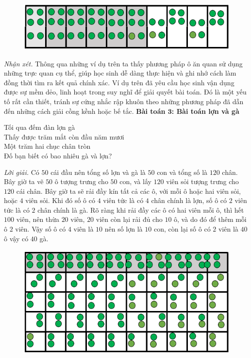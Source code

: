 \begin{multicols}{2}
	\begin{figure}[H]
		\vspace*{5pt}
		\centering
		\captionsetup{labelformat= empty, justification=centering}
		\includegraphics[width= 1\linewidth]{2}
		\vspace*{-15pt}
	\end{figure}
	\textit{Nhận xét.}
	Thông qua những ví dụ trên ta thấy phương pháp ô ăn quan sử dụng những trực quan cụ thể, giúp học sinh dễ dàng thực hiện và ghi nhớ cách làm đồng thời tìm ra kết quả chính xác.
	\vskip 0.1cm
	Ví dụ trên đã yêu cầu học sinh vận dụng được sự mềm dẻo, linh hoạt trong suy nghĩ để giải quyết bài toán. Đó là một yếu tố rất cần thiết, tránh sự cứng nhắc rập khuôn theo những phương pháp đã dẫn đến những cách giải cồng kềnh hoặc bế tắc.
	\vskip 0.1cm
	\textbf{\color{toancuabi}Bài toán $\pmb3$: Bài toán lợn và gà}
	\begin{center}
		Tối qua đếm đàn lợn gà\\
		Thấy được trăm mắt còn đầu năm mươi\\
		Một trăm hai chục chân tròn\\
		Đố bạn biết có bao nhiêu gà và lợn?
	\end{center}
	\textit{Lời giải.}
	Có $50$ cái đầu nên tổng số lợn và gà là $50$ con và tổng số là $120$ chân. Bây giờ ta vẽ $50$ ô tượng trưng cho $50$ con, và lấy $120$ viên sỏi tượng trưng cho $120$ cái chân.
	\vskip 0.1cm
	Bây giờ ta sẽ rải đầy kín tất cả các ô, với mỗi ô hoặc hai viên sỏi, hoặc $4$ viên sỏi. Khi đó số ô có $4$ viên tức là có $4$ chân chính là lợn, số ô có $2$ viên tức là có $2$ chân chính là gà.
	\vskip 0.1cm
	Rõ ràng khi rải đầy các ô có hai viên mỗi ô, thì hết $100$ viên, nên thừa $20$ viên, $20$ viên còn lại rải đủ cho $10$ ô, và do đó để thêm mỗi ô $2$ viên. Vậy số ô có $4$ viên là $10$ nên số lợn là $10$ con, còn lại số ô có $2$ viên là $40$ ô vậy có $40$ gà.
	\begin{figure}[H]
		\vspace*{-5pt}
		\centering
		\captionsetup{labelformat= empty, justification=centering}
		\includegraphics[width= 1\linewidth]{3}

\end{figure}
\end{multicols}
